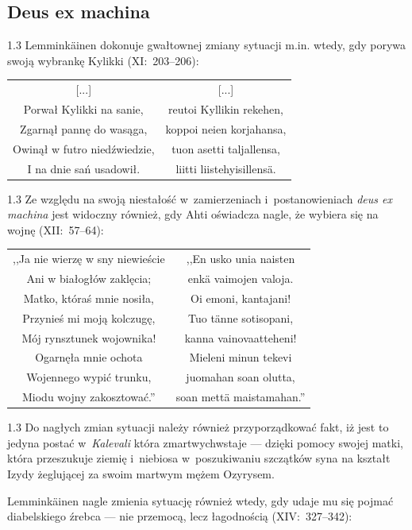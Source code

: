 \documentclass[11pt,a4paper,twoside]{report}
\begin{document}
\subsection*{Deus ex machina}
\begin{spacing}{1.3}
Lemminkäinen dokonuje gwałtownej zmiany sytuacji m.in. wtedy, gdy porywa swoją wybrankę Kylikki (XI:~203--206):
\end{spacing}
{\centering
\small
\begin{longtable}{c c}
{[...]} & {[...]}\\
Porwał Kylikki na sanie, & reutoi Kyllikin rekehen, \\
Zgarnął pannę do wasąga, & koppoi neien korjahansa, \\
Owinął w futro niedźwiedzie, & tuon asetti taljallensa, \\
I na dnie sań usadowił. & liitti liistehyisillensä. \\
\end{longtable}
}
\begin{spacing}{1.3}
Ze względu na swoją niestałość w~zamierzeniach i~postanowieniach \emph{deus ex machina} jest widoczny również, gdy Ahti oświadcza nagle, że wybiera się na wojnę (XII:~57--64):
\end{spacing}
{\centering
\small
\begin{longtable}{c c}
,,Ja nie wierzę w sny niewieście & ,,En usko unia naisten \\
Ani w białogłów zaklęcia; & enkä vaimojen valoja. \\
Matko, któraś mnie nosiła, & Oi emoni, kantajani! \\
Przynieś mi moją kolczugę, & Tuo tänne sotisopani, \\
Mój rynsztunek wojownika! & kanna vainovaatteheni! \\
Ogarnęła mnie ochota & Mieleni minun tekevi \\
Wojennego wypić trunku, & juomahan soan olutta, \\
Miodu wojny zakosztować.'' & soan mettä maistamahan.'' \\
\end{longtable}
}
\begin{spacing}{1.3}
Do nagłych zmian sytuacji należy również przyporządkować fakt, iż jest to jedyna postać w~\emph{Kalevali} która zmartwychwstaje --- dzięki pomocy swojej matki, która przeszukuje ziemię i~niebiosa w~poszukiwaniu szczątków syna na kształt Izydy żeglującej za swoim martwym mężem Ozyrysem.

Lemminkäinen nagle zmienia sytuację również wtedy, gdy udaje mu się pojmać diabelskiego źrebca --- nie przemocą, lecz łagodnością (XIV:~327--342):
\end{spacing}
\end{document}
